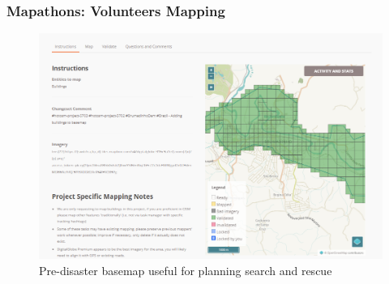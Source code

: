 \documentclass[10pt,mathserif]{beamer}
\begin{document}
\begin{frame}
   \frametitle{Mapathons: Volunteers Mapping}
  \begin{figure}[ht]
    \centering
    \includegraphics[width=0.6\paperwidth]{figures/task_osm_brazil.PNG}
    \caption{Pre-disaster basemap useful for planning search and rescue}
  \end{figure}
\end{frame}
\end{document}

